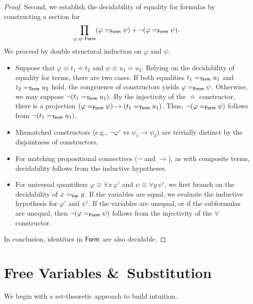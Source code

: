 \begin{proof}
    Second, we establish the decidability of equality for formulas by constructing a section for
    \[
        \prod_{\varphi,\psi\colon\fun{Form}} (\varphi\eq{\fun{Form}}\psi) + \neg(\varphi\eq{\fun{Form}}\psi).
    \]
    We proceed by double structural induction on $\varphi$ and $\psi$.
    \begin{itemize}
        \item Suppose that $\varphi\equiv t_1\doteq t_2$ and $\psi\equiv u_1\doteq u_2$. Relying on the decidability of equality for terms, there are two cases. If both equalities $t_1\mathrel{=_{\mathsf{Term}}}u_1$ and $t_2\mathrel{=_{\mathsf{Term}}}u_2$ hold, the congruence of constructors yields $\varphi\mathrel{=_{\mathsf{Form}}}\psi$. Otherwise, we may suppose $\neg(t_1\mathrel{=_{\mathsf{Term}}}u_1)$. By the injectivity of the $\doteq$ constructor, there is a projection $(\varphi\mathrel{=_{\mathsf{Form}}}\psi)\to(t_1\mathrel{=_{\mathsf{Term}}}u_1)$. Thus, $\neg(\varphi\mathrel{=_{\mathsf{Form}}}\psi)$ follows from $\neg(t_1\mathrel{=_{\mathsf{Term}}}u_1)$.
        
        \item Mismatched constructors (e.g., $\neg\varphi'$ vs $\psi_1\to\psi_2$) are trivially distinct by the disjointness of constructors.
        
        \item For matching propositional connectives ($\neg$ and $\to$), as with composite terms, decidability follows from the inductive hypotheses.
        
        \item For universal quantifiers $\varphi\equiv\forall x\,\varphi'$ and $\psi\equiv\forall y\,\psi'$, we first branch on the decidability of $x\mathrel{=_{\mathsf{Var}}}y$. If the variables are equal, we evaluate the inductive hypothesis for $\varphi'$ and $\psi'$. If the variables are unequal, or if the subformulas are unequal, then $\neg(\varphi\mathrel{=_{\mathsf{Form}}}\psi)$ follows from the injectivity of the $\forall$ constructor.
    \end{itemize}
    In conclusion, identities in $\mathsf{Form}$ are also decidable.
\end{proof}

\section{Free Variables \&\ Substitution}

We begin with a set-theoretic approach to build intuition.

